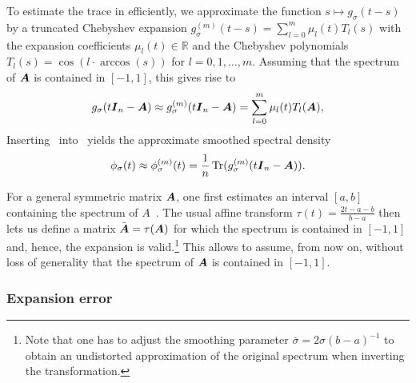 To estimate the trace in  efficiently, we approximate the function 
$s\mapsto g_{\sigma}(t- s)$ by a truncated
Chebyshev expansion $g_{\sigma}^{(m)}(t-s) = 
\sum_{l=0}^{m} \mu_l(t) T_l(s)$
with the expansion coefficients $\mu_l(t) \in \mathbb R$ and the Chebyshev polynomials
$T_l(s) = \cos(l \cdot \arccos(s))$ for $l = 0,1,\ldots,m$.
Assuming that the spectrum of $\boldsymbol{A}$ is contained in $[-1,1]$, this gives rise to
\begin{equation}
    g_{\sigma}(t\boldsymbol{I}_n - \boldsymbol{A}) \approx g_{\sigma}^{(m)}(t\boldsymbol{I}_n - \boldsymbol{A}) = \sum_{l=0}^{m} \mu_l(t) T_l(\boldsymbol{A}),
    \label{equ:matrix-expansion}
\end{equation}
Inserting~ into~ yields the approximate smoothed spectral density
\begin{equation}
    \phi_{\sigma}(t) \approx \phi_{\sigma}^{(m)}(t) =  \frac{1}{n} \operatorname{Tr}(g_{\sigma}^{(m)}(t \boldsymbol{I}_n - \boldsymbol{A})).
    \label{equ:expanded-spectral-density}
\end{equation}
\begin{remark}
For a general symmetric matrix $\boldsymbol{A}$, one first estimates an interval $[a,b]$ containing the spectrum of $A$~\cite{zhou-2011-bounding-spectrum}. The usual affine transform
$\tau(t) = \frac{2t - a - b}{b - a}$
then lets us define a matrix $\bar{\boldsymbol{A}} = \tau(\boldsymbol{A})$ for which the spectrum is contained in $[-1, 1]$ and, hence, the expansion  is valid.\footnote{Note that one has to adjust the smoothing parameter $\bar{\sigma} = 2 \sigma (b - a)^{-1}$ to obtain an undistorted approximation of the original spectrum when inverting the transformation.} This allows to assume, from now on, without loss of generality that the spectrum of $\boldsymbol{A}$ is contained in $[-1, 1]$.
\end{remark}


\subsubsection{Expansion error}
\label{subsubsec:expansion-error}


